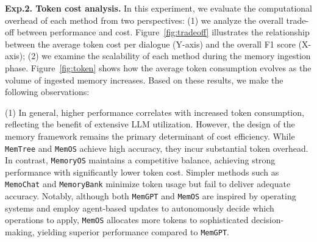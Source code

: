  \textbf{Exp.2. Token cost analysis.}
In this experiment, we evaluate the computational overhead of each method from two perspectives: (1) we analyze the overall trade-off between performance and cost. Figure~\ref{fig:tradeoff} illustrates the relationship between the average token cost per dialogue (Y-axis) and the overall F1 score (X-axis); (2) we examine the scalability of each method during the memory ingestion phase. Figure~\ref{fig:token} shows how the average token consumption evolves as the volume of ingested memory increases. Based on these results, we make the following observations:



(1) In general, higher performance correlates with increased token consumption, reflecting the benefit of extensive LLM utilization. However, the design of the memory framework remains the primary determinant of cost efficiency. While {\tt MemTree} and {\tt MemOS} achieve high accuracy, they incur substantial token overhead. In contrast, {\tt MemoryOS} maintains a competitive balance, achieving strong performance with significantly lower token cost. Simpler methods such as {\tt MemoChat} and {\tt MemoryBank} minimize token usage but fail to deliver adequate accuracy. Notably, although both {\tt MemGPT} and {\tt MemOS} are inspired by operating systems and employ agent-based updates to autonomously decide which operations to apply, {\tt MemOS} allocates more tokens to sophisticated decision-making, yielding superior performance compared to {\tt MemGPT}.


